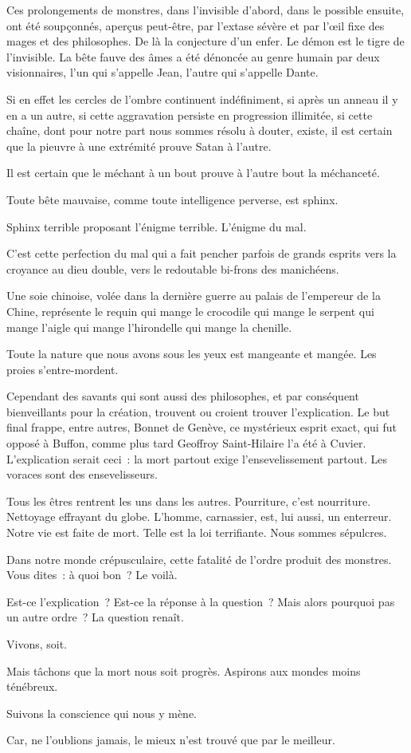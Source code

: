 \documentclass[french,twoside]{book} %
\begin{document}
Ces prolongements de monstres, dans l’invisible d’abord, dans le possible ensuite, ont été soupçonnés, aperçus peut-être, par l’extase sévère et par l’œil fixe des mages et des philosophes. De là la conjecture d’un enfer. Le démon est le tigre de l’invisible. La bête fauve des âmes a été dénoncée au genre humain par  deux visionnaires, l’un qui s’appelle Jean, l’autre qui s’appelle Dante.\par
Si en effet les cercles de l’ombre continuent indéfiniment, si après un anneau il y en a un autre, si cette aggravation persiste en progression illimitée, si cette chaîne, dont pour notre part nous sommes résolu à douter, existe, il est certain que la pieuvre à une extrémité prouve Satan à l’autre.\par
Il est certain que le méchant à un bout prouve à l’autre bout la méchanceté.\par
Toute bête mauvaise, comme toute intelligence perverse, est sphinx.\par
Sphinx terrible proposant l’énigme terrible. L’énigme du mal.\par
C’est cette perfection du mal qui a fait pencher parfois de grands esprits vers la croyance au dieu double, vers le redoutable bi-frons des manichéens.\par
Une soie chinoise, volée dans la dernière guerre au palais de l’empereur de la Chine, représente le requin qui mange le crocodile qui mange le serpent qui mange l’aigle qui mange l’hirondelle qui mange la chenille.\par
Toute la nature que nous avons sous les yeux est mangeante et mangée. Les proies s’entre-mordent.\par
Cependant des savants qui sont aussi des philosophes, et par conséquent bienveillants pour la création, trouvent ou croient trouver l’explication. Le but final frappe, entre autres, Bonnet de Genève, ce mystérieux esprit exact, qui fut opposé à Buffon, comme plus tard Geoffroy Saint-Hilaire l’a été à Cuvier.  L’explication serait ceci : la mort partout exige l’ensevelissement partout. Les voraces sont des ensevelisseurs.\par
Tous les êtres rentrent les uns dans les autres. Pourriture, c’est nourriture. Nettoyage effrayant du globe. L’homme, carnassier, est, lui aussi, un enterreur. Notre vie est faite de mort. Telle est la loi terrifiante. Nous sommes sépulcres.\par
Dans notre monde crépusculaire, cette fatalité de l’ordre produit des monstres. Vous dites : à quoi bon ? Le voilà.\par
Est-ce l’explication ? Est-ce la réponse à la question ? Mais alors pourquoi pas un autre ordre ? La question renaît.\par
Vivons, soit.\par
Mais tâchons que la mort nous soit progrès. Aspirons aux mondes moins ténébreux.\par
Suivons la conscience qui nous y mène.\par
Car, ne l’oublions jamais, le mieux n’est trouvé que par le meilleur.
\end{document}
